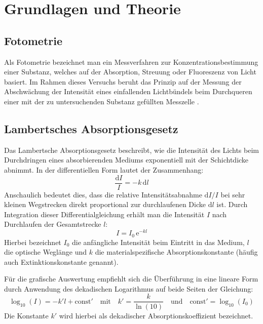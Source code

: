 \documentclass[12pt,a4paper,titlepage]{scrartcl}
\numberwithin{equation}{section}
\numberwithin{table}{section}
\numberwithin{figure}{section}
\begin{document}
\section{Grundlagen und Theorie}
\subsection{Fotometrie}
Als Fotometrie bezeichnet man ein Messverfahren zur Konzentrationsbestimmung einer Substanz, welches auf der Absorption, Streuung oder Fluoreszenz von Licht basiert. Im Rahmen dieses Versuchs beruht das Prinzip auf der Messung der Abschwächung der Intensität eines einfallenden Lichtbündels beim Durchqueren einer mit der zu untersuchenden Substanz gefüllten Messzelle \cite{PAPskript}.

\subsection{Lambertsches Absorptionsgesetz}
Das Lambertsche Absorptionsgesetz beschreibt, wie die Intensität des Lichts beim Durchdringen eines absorbierenden Mediums exponentiell mit der Schichtdicke abnimmt. In der differentiellen Form lautet der Zusammenhang:
\begin{equation}
    \frac{\mathrm{d}I}{I} = -k \,\mathrm{d}l
\end{equation}
Anschaulich bedeutet dies, dass die relative Intensitätsabnahme $\mathrm{d}I/I$ bei sehr kleinen Wegstrecken direkt proportional zur durchlaufenen Dicke $\mathrm{d}l$ ist. Durch Integration dieser Differentialgleichung erhält man die Intensität $I$ nach Durchlaufen der Gesamtstrecke $l$:
\begin{equation}
    I = I_0 \, \mathrm{e}^{-k l}
\end{equation}
Hierbei bezeichnet $I_0$ die anfängliche Intensität beim Eintritt in das Medium, $l$ die optische Weglänge und $k$ die materialspezifische Absorptionskonstante (häufig auch Extinktionskonstante genannt).

Für die grafische Auswertung empfiehlt sich die Überführung in eine lineare Form durch Anwendung des dekadischen Logarithmus auf beide Seiten der Gleichung:
\begin{equation}
    \log_{10}(I) = -k' l + \text{const}' \quad \text{mit} \quad k' = \frac{k}{\ln(10)} \quad \text{und} \quad \text{const}' = \log_{10}(I_0)
    \label{eq:log10I}
\end{equation}
Die Konstante $k'$ wird hierbei als dekadischer Absorptionskoeffizient bezeichnet.
\end{document}
